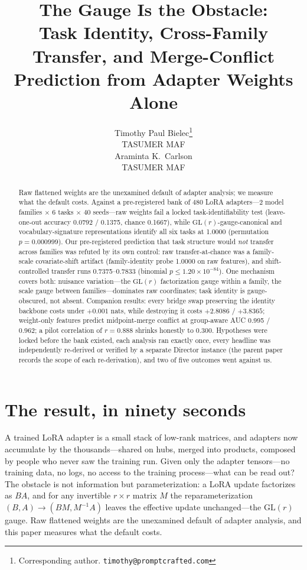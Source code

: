 \documentclass{article}
\title{%
  The Gauge Is the Obstacle:\\
  \large Task Identity, Cross-Family Transfer, and Merge-Conflict
  Prediction from Adapter Weights Alone%
}
\author{%
  Timothy Paul Bielec\thanks{Corresponding author.
  \texttt{timothy@promptcrafted.com}}\\
  TASUMER MAF\\
  \And
  Araminta K.\ Carlson\\
  TASUMER MAF\\
}
\begin{document}
\maketitle

\begin{abstract}
Raw flattened weights are the unexamined default of adapter analysis; we
measure what the default costs. Against a pre-registered bank of 480 LoRA
adapters---2 model families $\times$ 6 tasks $\times$ 40 seeds---raw weights
fail a locked task-identifiability test (leave-one-out accuracy 0.0792 /
0.1375, chance 0.1667), while $\mathrm{GL}(r)$-gauge-canonical and
vocabulary-signature representations identify all six tasks at 1.0000
(permutation $p = 0.000999$). Our pre-registered prediction that task
structure would \emph{not} transfer across families was refuted by its own
control: raw transfer-at-chance was a family-scale covariate-shift artifact
(family-identity probe 1.0000 on raw features), and shift-controlled
transfer runs 0.7375--0.7833 (binomial $p \le 1.20\times10^{-84}$). One
mechanism covers both: nuisance variation---the $\mathrm{GL}(r)$
factorization gauge within a family, the scale gauge between
families---dominates raw coordinates; task identity is gauge-obscured, not
absent. Companion results: every bridge swap preserving the identity
backbone costs under $+0.001$ nats, while destroying it costs $+2.8086$ /
$+3.8365$; weight-only features predict midpoint-merge conflict at
group-aware AUC 0.995 / 0.962; a pilot correlation of $r = 0.888$ shrinks
honestly to 0.300. Hypotheses were locked before the bank existed, each
analysis ran exactly once, every headline was independently re-derived or
verified by a separate Director instance (the parent paper records the
scope of each re-derivation), and two of five outcomes went against us.
\end{abstract}

\section{The result, in ninety seconds}
\label{sec:hook}

A trained LoRA adapter is a small stack of low-rank matrices, and adapters
now accumulate by the thousands---shared on hubs, merged into products,
composed by people who never saw the training run. Given only the adapter
tensors---no training data, no logs, no access to the training
process---what can be read out? The obstacle is not information but
parameterization: a LoRA update factorizes as $BA$, and for any invertible
$r \times r$ matrix $M$ the reparameterization $(B, A) \rightarrow (BM,
M^{-1}A)$ leaves the effective update unchanged---the $\mathrm{GL}(r)$
gauge. Raw flattened weights are the unexamined default of adapter
analysis, and this paper measures what the default costs.
\end{document}
